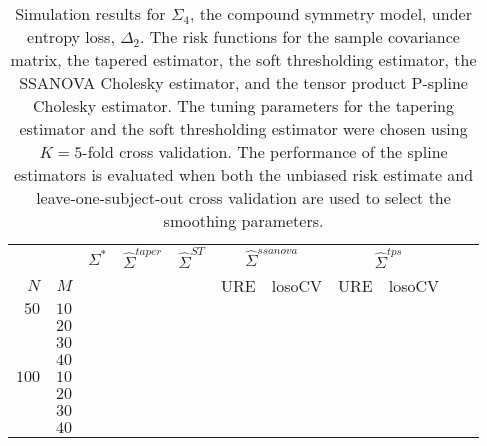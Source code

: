 \documentclass[12pt]{article}
\newcommand{\ra}[1]{\renewcommand{\arraystretch}{#1}}
\theoremstyle{definition}
\begin{document}
\begin{table}\centering
\ra{1.3}
\caption{Simulation results for $\Sigma_4$, the compound symmetry model,  under entropy loss, $\Delta_2$. The risk functions for the sample covariance matrix, the tapered estimator, the soft thresholding estimator, the SSANOVA Cholesky estimator, and the tensor product P-spline Cholesky estimator. The tuning parameters for the tapering estimator and the soft thresholding estimator were chosen using $K = 5$-fold cross validation. The performance of the spline estimators is evaluated when both the unbiased risk estimate and leave-one-subject-out cross validation are used to select the smoothing parameters.}
\begin{tabular}{@{}rrrcrcrrcrr@{}}\toprule
   &            & \multicolumn{1}{c}{$\Sigma^*$}  & \multicolumn{1}{c}{$\hat{\Sigma}^{taper}$} &\multicolumn{1}{c}{$\hat{\Sigma}^{ST}$} &\multicolumn{2}{c}{ $\hat{\Sigma}^{ssanova}$} &  \multicolumn{2}{c}{ $\hat{\Sigma}^{tps}$}\\
$N$ & $M$ 	&	  &	& & \multicolumn{1}{c}{\mbox{URE}} & \multicolumn{1}{c}{\mbox{losoCV}} &\multicolumn{1}{c}{\mbox{URE}} & \multicolumn{1}{c}{\mbox{losoCV}}\\ \midrule
$50$ & $10$\\
  & $20$  &&&&&&&\\
  & $30$   &&&&&&&\\
& $40$   &&&&&&&\\ 
$100$ & $10$ &&&&&&&\\
& $20$  &&&&&&& \\
& $30$  &&&&&&& \\
& $40$  &&&&&&& \\ 
\bottomrule
\end{tabular}
\end{table}
\end{document}
